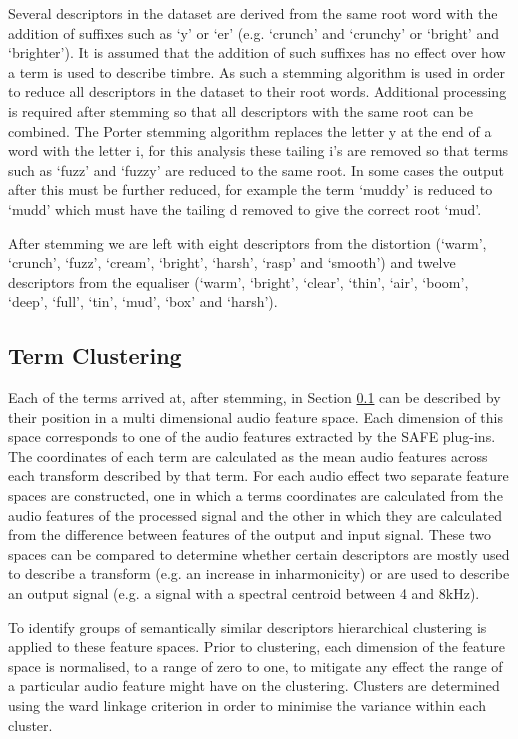 		Several descriptors in the dataset are derived from the same root word with the addition of suffixes such as
		`y' or `er' (e.g. `crunch' and `crunchy' or `bright' and `brighter'). It is assumed that the addition of
		such suffixes has no effect over how a term is used to describe timbre. As such a stemming algorithm
		\citep{porter1980an} is used in order to reduce all descriptors in the dataset to their root words.
		Additional processing is required after stemming so that all descriptors with the same root can be combined.
		The Porter stemming algorithm replaces the letter y at the end of a word with the letter i, for this
		analysis these tailing i's are removed so that terms such as `fuzz' and `fuzzy' are reduced to the same
		root. In some cases the output after this  must be further reduced, for example the term `muddy' is
		reduced to `mudd' which must have the tailing d removed to give the correct root `mud'.

		After stemming we are left with eight descriptors from the distortion (`warm', `crunch', `fuzz', `cream',
		`bright', `harsh', `rasp' and `smooth') and twelve descriptors from the equaliser (`warm', `bright',
		`clear', `thin', `air', `boom', `deep', `full', `tin', `mud', `box' and `harsh').

	\subsection{Term Clustering}
	\label{sec:TimbreEvaluation-Analysis-TermClustering}
		Each of the terms arrived at, after stemming, in Section \ref{sec:TimbreEvaluation-Analysis-TermClustering}
		can be described by their position in a multi dimensional audio feature space. Each dimension of this space
		corresponds to one of the audio features extracted by the SAFE plug-ins. The coordinates of each term are
		calculated as the mean audio features across each transform described by that term. For each audio effect
		two separate feature spaces are constructed, one in which a terms coordinates are calculated from the audio
		features of the processed signal and the other in which they are calculated from the difference between
		features of the output and input signal. These two spaces can be compared to determine whether certain
		descriptors are mostly used to describe a transform (e.g. an increase in inharmonicity) or are used to
		describe an output signal (e.g. a signal with a spectral centroid between 4 and 8kHz).

		To identify groups of semantically similar descriptors hierarchical clustering is applied to these feature
		spaces. Prior to clustering, each dimension of the feature space is normalised, to a range of zero to one,
		to mitigate any effect the range of a particular audio feature might have on the clustering. Clusters are
		determined using the ward linkage criterion in order to minimise the variance within each cluster.

